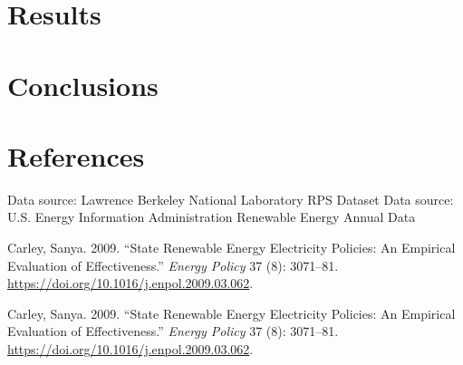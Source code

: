 \documentclass[
  12pt,
  letterpaper,
]{article}
\newlength{\cslhangindent}
\newenvironment{CSLReferences}[2] %
 {\begin{list}{}{%
  \setlength{\itemindent}{0pt}
  \setlength{\leftmargin}{0pt}
  \setlength{\parsep}{0pt}
  \ifodd #1
   \setlength{\leftmargin}{\cslhangindent}
   \setlength{\itemindent}{-1\cslhangindent}
  \fi
  \setlength{\itemsep}{#2\baselineskip}}}
 {\end{list}}
\begin{document}
\section{Results}\label{results}

\section{Conclusions}\label{conclusions}

\section{References}\label{references}

\label{refs}
\begin{CSLReferences}{1}{0}
Data source: Lawrence Berkeley National Laboratory RPS Dataset Data
source: U.S. Energy Information Administration Renewable Energy Annual
Data

\label{refs}
\begin{CSLReferences}{1}{0}
Carley, Sanya. 2009. {``State Renewable Energy Electricity Policies: An
Empirical Evaluation of Effectiveness.''} \emph{Energy Policy} 37 (8):
3071--81. \url{https://doi.org/10.1016/j.enpol.2009.03.062}.

\end{CSLReferences}

Carley, Sanya. 2009. {``State Renewable Energy Electricity Policies: An
Empirical Evaluation of Effectiveness.''} \emph{Energy Policy} 37 (8):
3071--81. \url{https://doi.org/10.1016/j.enpol.2009.03.062}.

\end{CSLReferences}
\end{document}
